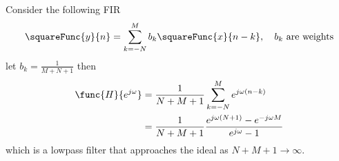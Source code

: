 \begin{example}
    Consider the following FIR
    \begin{equation*}
        \squareFunc{y}{n} = \sum_{k = -N}^{M} b_k \squareFunc{x}{n - k}, \quad b_k \ \text{are weights}
    \end{equation*}
    let \(b_k = \frac{1}{M + N  + 1} \) then 
    \begin{align*}
        \func{H}{e^{j\omega}} &= \dfrac{1}{N + M + 1} \sum_{k = -N}^M e^{j\omega (n-k)}\\
        &= \dfrac{1}{N + M + 1} \dfrac{e^{j\omega (N + 1)} - e^{-j\omega M}}{e^{j\omega } - 1}
    \end{align*}
    which is a lowpass filter that approaches the ideal as \(N + M + 1 \to \infty\).
\end{example}
